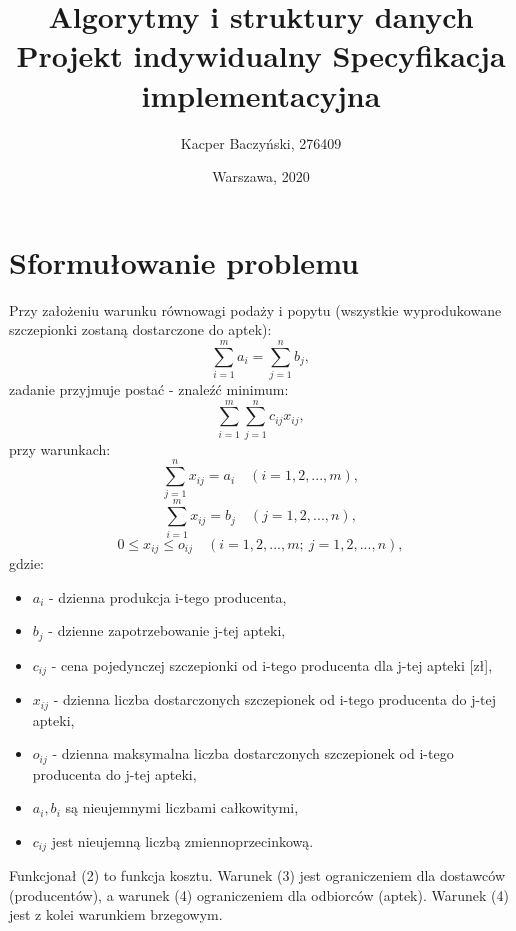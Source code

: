 \documentclass[11pt]{article}
\title{Algorytmy i struktury danych
\\Projekt indywidualny
\bigbreak Specyfikacja implementacyjna}
\author{Kacper Baczyński, 276409}
\date{Warszawa, 2020}
\begin{document}
\maketitle

\section{Sformułowanie problemu}
Przy założeniu warunku równowagi podaży i popytu (wszystkie wyprodukowane szczepionki zostaną dostarczone do aptek):
\begin{equation}
    \sum\limits_{i=1}^{m} a_{i} = \sum\limits_{j=1}^n b_{j},
\end{equation}
zadanie przyjmuje postać - znaleźć minimum:
\begin{equation}
    \sum\limits_{i=1}^{m}\sum\limits_{j=1}^{n}c_{ij}x_{ij},
\end{equation}
przy warunkach:
\begin{equation}
    \sum\limits_{j=1}^{n} x_{ij} = a_{i} \quad (i = 1, 2,..., m),
\end{equation}
\begin{equation}
    \sum\limits_{i=1}^{m} x_{ij} = b_{j} \quad (j = 1, 2,..., n),
\end{equation}
\begin{equation}
    0 \leq x_{ij} \leq o_{ij} \quad (i = 1, 2,..., m; \ j = 1, 2,..., n),
\end{equation}
gdzie:
\begin{itemize}
    \item $ a_{i} $ - dzienna produkcja i-tego producenta,
    \item $ b_{j} $ - dzienne zapotrzebowanie j-tej apteki,
    \item $ c_{ij} $ - cena pojedynczej szczepionki od i-tego producenta dla j-tej apteki [zł],
    \item $ x_{ij} $ - dzienna liczba dostarczonych szczepionek od i-tego producenta do j-tej apteki,
    \item $ o_{ij} $ - dzienna maksymalna liczba dostarczonych szczepionek od i-tego producenta do j-tej apteki,
    \item $ a_{i}, b_{i} $ są nieujemnymi liczbami całkowitymi,
    \item $ c_{ij} $ jest nieujemną liczbą zmiennoprzecinkową.
\end{itemize}
Funkcjonał (2) to funkcja kosztu. Warunek (3) jest ograniczeniem dla dostawców (producentów), a warunek (4) ograniczeniem dla odbiorców (aptek). Warunek (4) jest z kolei warunkiem brzegowym.
\end{document}
